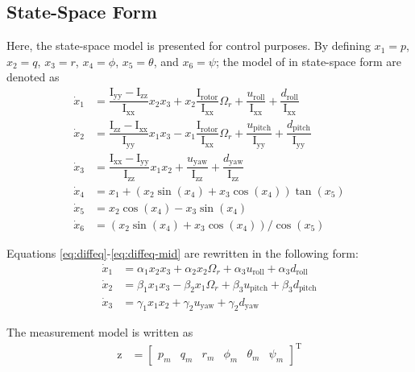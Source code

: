 \documentclass[3p,times]{elsarticle}
\begin{document}
\subsection{State-Space Form}
\noindent Here, the state-space model is presented for control purposes.
By defining $x_1 = p$, $x_2 = q$, $x_3 = r$, $x_4 = \phi$, $x_5 = \theta$, and $x_6 = \psi$; the model of in state-space form are denoted as
\begin{align}\label{eq:diffeq}
		\dot x_1 &= \dfrac{\mathrm{I}_{\text{yy}} - \mathrm{I}_{\text{zz}}}{\mathrm{I}_{\text{xx}}} x_2 x_3 + x_2 \dfrac{\mathrm{I}_{\text{rotor}}}{\mathrm{I}_{\text{xx}}}\Omega_r + \dfrac{u_{\text{roll}}}{\mathrm{I}_{\text{xx}}} + \dfrac{d_{\text{roll}}}{\mathrm{I}_{\text{xx}}} \\[0.5em]
	\dot x_2 &= \dfrac{\mathrm{I}_{\text{zz}} - \mathrm{I}_{\text{xx}}}{\mathrm{I}_{\text{yy}}} x_1 x_3 - x_1 \dfrac{\mathrm{I}_{\text{rotor}}}{\mathrm{I}_{\text{xx}}}\Omega_r + \dfrac{u_{\text{pitch}}}{\mathrm{I}_{\text{yy}}} + \dfrac{d_{\text{pitch}}}{\mathrm{I}_{\text{yy}}}\\[0.5em] \label{eq:diffeq-mid}
	\dot x_3 &= \dfrac{\mathrm{I}_{\text{xx}} - \mathrm{I}_{\text{yy}}}{\mathrm{I}_{\text{zz}}} x_1 x_2 + \dfrac{u_{\text{yaw}}}{\mathrm{I}_{\text{zz}}} + \dfrac{d_{\text{yaw}}}{\mathrm{I}_{\text{zz}}}\\[0.5em] 
    \dot x_4 &= x_1 + (x_2\sin(x_4) + x_3\cos(x_4))\tan(x_5)
\\[0.5em]
	\dot x_5 &= x_2\cos(x_4) - x_3\sin(x_4)\\[0.5em]
	\dot x_6 &= (x_2\sin(x_4) + x_3\cos(x_4))/\cos(x_5) \label{eq:diffeq-end}
\end{align}

Equations \eqref{eq:diffeq}-\eqref{eq:diffeq-mid} are rewritten in the following form:
\begin{align}
    \dot x_1 &= \alpha_1 x_2 x_3 + \alpha_2 x_2\Omega_r + \alpha_3 u_{\text{roll}} + \alpha_3 d_{\text{roll}} \\[0.5em]
\dot x_2 &= \beta_1 x_1 x_3 - \beta_2 x_1\Omega_r + \beta_3 u_{\text{pitch}}+ \beta_3 d_{\text{pitch}}\\[0.5em]
\dot x_3 &= \gamma_1 x_1 x_2 + \gamma_2u_{\text{yaw}} + \gamma_2d_{\text{yaw}}
\end{align}

The measurement model is written as
\begin{equation}
	\begin{split}
		\boldsymbol{\mathrm{z}} &= \begin{bmatrix}
			p_m & q_m & r_m & \phi_m & \theta_m & \psi_m
		\end{bmatrix}^\mathrm{T}
	\end{split}
\end{equation}
\end{document}
